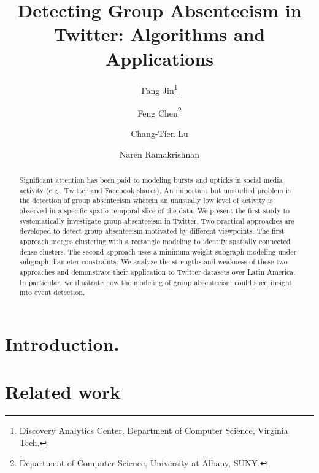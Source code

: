\documentclass[twoside,leqno,twocolumn]{article}
\begin{document}

\title{Detecting Group Absenteeism in Twitter: Algorithms and Applications}
\author{Fang Jin\thanks{Discovery Analytics Center, Department of Computer Science, Virginia Tech.} \\
\and
Feng Chen\thanks{Department of Computer Science, University at Albany, SUNY.}\\
\and
Chang-Tien Lu\footnotemark[1]\\
\and
Naren Ramakrishnan\footnotemark[1]\\
}
\date{}
\maketitle




\begin{abstract} \small\baselineskip=9pt Significant attention has been paid to modeling bursts and upticks in social media activity (e.g., Twitter and Facebook shares). An important but unstudied problem is the detection of group absenteeism wherein an unusually low level of activity is observed in a specific spatio-temporal slice of the data. We present the first study to systematically investigate group absenteeism in Twitter. Two practical approaches are developed to detect group absenteeism motivated by different viewpoints. The first approach merges clustering with a rectangle modeling to identify spatially connected dense clusters. The second approach uses a minimum weight subgraph modeling under subgraph diameter constraints. We analyze the strengths and weakness of these two approaches and demonstrate their application to Twitter datasets over Latin America. In particular, we illustrate how the modeling of group absenteeism could shed insight into event detection.\end{abstract}


\section{Introduction.} \label{sec:intro}

%
\section{Related work} \label{sec:related}

%
\end{document}
